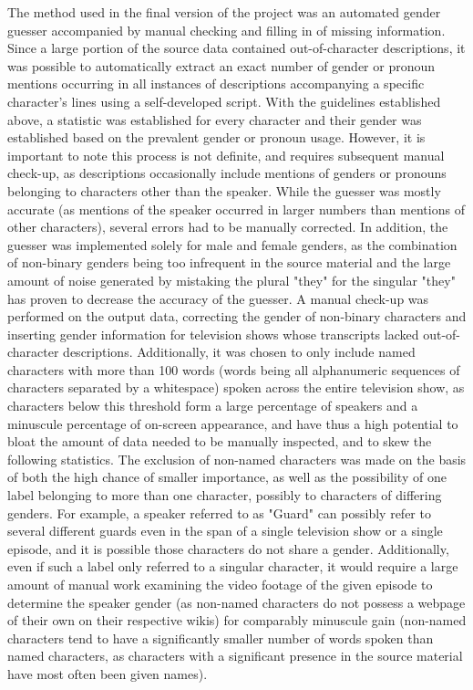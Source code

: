 \documentclass[a4paper, 11pt]{article}
\begin{document}
The method used in the final version of the project was an automated gender guesser accompanied by manual checking and filling in of missing information. Since a large portion of the source data contained out-of-character descriptions, it was possible to automatically extract an exact number of gender or pronoun mentions occurring in all instances of descriptions accompanying a specific character's lines using a self-developed script. With the guidelines established above, a statistic was established for every character and their gender was established based on the prevalent gender or pronoun usage. However, it is important to note this process is not definite, and requires subsequent manual check-up, as descriptions occasionally include mentions of genders or pronouns belonging to characters other than the speaker. While the guesser was mostly accurate (as mentions of the speaker occurred in larger numbers than mentions of other characters), several errors had to be manually corrected. In addition, the guesser was implemented solely for male and female genders, as the combination of non-binary genders being too infrequent in the source material and the large amount of noise generated by mistaking the plural "they" for the singular "they" has proven to decrease the accuracy of the guesser. A manual check-up was performed on the output data, correcting the gender of non-binary characters and inserting gender information for television shows whose transcripts lacked out-of-character descriptions. Additionally, it was chosen to only include named characters with more than 100 words (words being all alphanumeric sequences of characters separated by a whitespace) spoken across the entire television show, as characters below this threshold form a large percentage of speakers and a minuscule percentage of on-screen appearance, and have thus a high potential to bloat the amount of data needed to be manually inspected, and to skew the following statistics. The exclusion of non-named characters was made on the basis of both the high chance of smaller importance, as well as the possibility of one label belonging to more than one character, possibly to characters of differing genders. For example, a speaker referred to as "Guard" can possibly refer to several different guards even in the span of a single television show or a single episode, and it is possible those characters do not share a gender. Additionally, even if such a label only referred to a singular character, it would require a large amount of manual work examining the video footage of the given episode to determine the speaker gender (as non-named characters do not possess a webpage of their own on their respective wikis) for comparably minuscule gain (non-named characters tend to have a significantly smaller number of words spoken than named characters, as characters with a significant presence in the source material have most often been given names).
\end{document}
